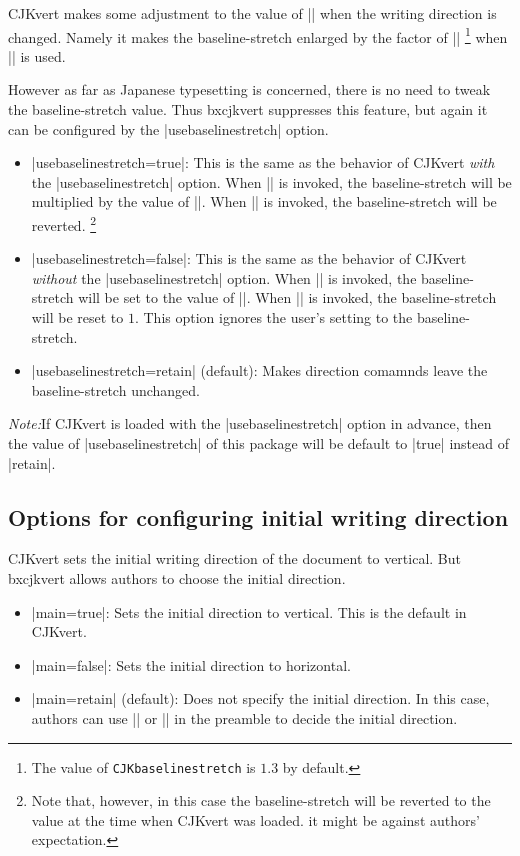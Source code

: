\documentclass[a4paper]{article}
\newcommand{\Pkg}[1]{\textsf{#1}}
\newcommand{\Note}{\par\noindent \emph{Note:}\quad}
\newcommand{\Means}{:\hspace{1em plus 1em}}
\newcommand{\Cs}[1]{\texttt{\symbol{`\\}#1}}
\begin{document}
\Pkg{CJKvert} makes some adjustment to the value of |\baselinestretch|
when the writing direction is changed.
Namely it makes the baseline-stretch enlarged by the factor of
|\CJKbaselinestretch|%
\footnote{The value of \Cs{CJKbaselinestretch} is $1.3$ by default.}
when |\CJKvert| is used.

However as far as Japanese typesetting is concerned,
there is no need to tweak the baseline-stretch value.
Thus \Pkg{bxcjkvert} suppresses this feature, but again
it can be configured by the |usebaselinestretch| option.


\begin{itemize}
\item |usebaselinestretch=true|\Means
  This is the same as the behavior of \Pkg{CJKvert} \emph{with}
  the |usebaselinestretch| option.
  When |\CJKvert| is invoked, the baseline-stretch will be multiplied
  by the value of |\CJKbaselinestretch|.
  When |\CJKhorz| is invoked, the baseline-stretch will be reverted.%
  \footnote{Note that, however, in this case the baseline-stretch will
    be reverted to the value at the time when \Pkg{CJKvert} was loaded.
    it might be against authors' expectation.}
\item |usebaselinestretch=false|\Means
  This is the same as the behavior of \Pkg{CJKvert} \emph{without}
  the |usebaselinestretch| option.
  When |\CJKvert| is invoked, the baseline-stretch will be set
  to the value of |\CJKbaselinestretch|.
  When |\CJKhorz| is invoked, the baseline-stretch will be
  reset to $1$.
  This option ignores the user's setting to the baseline-stretch.
\item |usebaselinestretch=retain| (default)\Means
  Makes direction comamnds leave the baseline-stretch
  unchanged.
\end{itemize}

\Note If \Pkg{CJKvert} is loaded with the |usebaselinestretch|
option in advance,
then the value of |usebaselinestretch| of this package
will be default to |true| instead of |retain|.

\subsection{Options for configuring initial writing direction}

\Pkg{CJKvert} sets the initial writing direction of the document
to vertical.
But \Pkg{bxcjkvert} allows authors to choose the initial direction.

\begin{itemize}
\item |main=true|\Means
  Sets the initial direction to vertical.
  This is the default in \Pkg{CJKvert}.
\item |main=false|\Means
  Sets the initial direction to horizontal.
\item |main=retain| (default)\Means
  Does not specify the initial direction.
  In this case, authors can use |\CJKvert| or |\CJKhorz|
  in the preamble to decide the initial direction.
\end{itemize}

\end{document}

